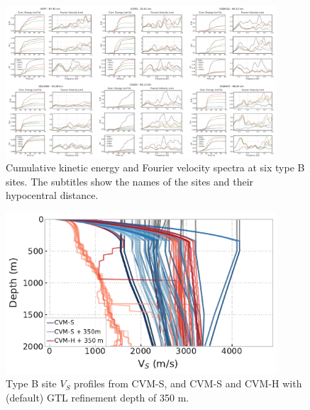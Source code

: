 \clearpage
\begin{figure}[!ht]
  \centering
  \includegraphics[width=0.9\textwidth]{figures/figure_vs30_12.pdf}
  \caption{Cumulative kinetic energy and Fourier velocity spectra at six type B sites. The subtitles show the names of the sites and their hypocentral distance.
  }
  \label{fig:vs30-12}
\end{figure}

\clearpage
\begin{figure}[!ht]
  \centering
  \includegraphics[width=0.9\textwidth]{figures/figure_vs30_13.pdf}
  \caption{Type B site $V_S$ profiles from CVM-S, and CVM-S and CVM-H with (default) \citet{elyVs30derivedNearsurfaceSeismic2010} GTL refinement depth of 350 m.}
  \label{fig:vs30-13}
\end{figure}

